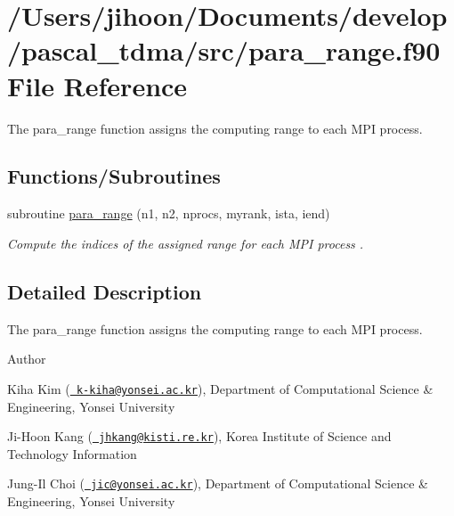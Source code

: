 \hypertarget{para__range_8f90}{}\section{/\+Users/jihoon/\+Documents/develop/pascal\+\_\+tdma/src/para\+\_\+range.f90 File Reference}
\label{para__range_8f90}


The para\+\_\+range function assigns the computing range to each M\+PI process.  


\subsection*{Functions/\+Subroutines}
\begin{DoxyCompactItemize}
\item 
subroutine \mbox{\hyperlink{para__range_8f90_ab75ab386311975aa4ff7cac06798fcd4}{para\+\_\+range}} (n1, n2, nprocs, myrank, ista, iend)
\begin{DoxyCompactList}\small\item\em Compute the indices of the assigned range for each M\+PI process . \end{DoxyCompactList}\end{DoxyCompactItemize}


\subsection{Detailed Description}
The para\+\_\+range function assigns the computing range to each M\+PI process. 

\begin{DoxyAuthor}{Author}

\end{DoxyAuthor}

\begin{DoxyItemize}
\item Kiha Kim (\href{mailto:k-kiha@yonsei.ac.kr}{\texttt{ k-\/kiha@yonsei.\+ac.\+kr}}), Department of Computational Science \& Engineering, Yonsei University
\item Ji-\/\+Hoon Kang (\href{mailto:jhkang@kisti.re.kr}{\texttt{ jhkang@kisti.\+re.\+kr}}), Korea Institute of Science and Technology Information
\item Jung-\/\+Il Choi (\href{mailto:jic@yonsei.ac.kr}{\texttt{ jic@yonsei.\+ac.\+kr}}), Department of Computational Science \& Engineering, Yonsei University
\end{DoxyItemize}

